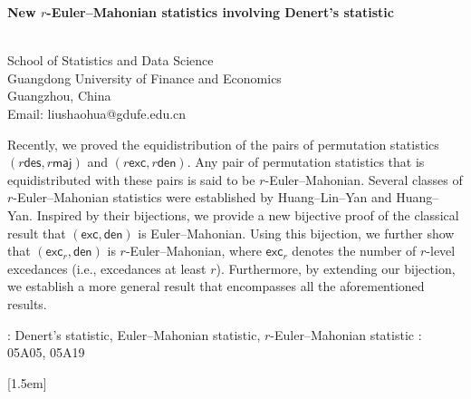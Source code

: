 \documentclass[12pt]{article}
\begin{document}


\begin{center}
{\Large{\bf{New $r$-Euler--Mahonian statistics involving Denert's statistic
			\vskip 1mm}}}
\end{center}
\vspace{0mm}
\begin{center}
	\\
	\vskip 1mm
	{School of Statistics and Data Science\\
		Guangdong University of Finance and Economics\\
		Guangzhou, China\\
		Email: liushaohua@gdufe.edu.cn}
\end{center}
 \title{}


 \vskip 1mm

Recently, we proved the equidistribution of the pairs of permutation statistics $(r\textsf{des},r\textsf{maj})$ and $(r\textsf{exc},r\textsf{den})$.
Any pair of permutation statistics that is equidistributed with these pairs is said to be $r$-Euler--Mahonian.
Several classes of $r$-Euler--Mahonian statistics were established by Huang--Lin--Yan and Huang--Yan.
Inspired by their bijections,
we provide a new bijective proof of the classical result that $(\textsf{exc},\textsf{den})$ is Euler--Mahonian.
Using this bijection, we further show that $(\textsf{exc}_{r},\textsf{den})$ is $r$-Euler--Mahonian,
where $\textsf{exc}_{r}$ denotes the number of $r$-level excedances (i.e., excedances at least $r$).
Furthermore, by extending our bijection, 
we establish a more general result that encompasses all the aforementioned results.



   \vskip 1mm
: Denert's statistic,
Euler--Mahonian statistic, $r$-Euler--Mahonian statistic
   \vskip 1mm
: 05A05, 05A19
   \vskip -2mm

[1.5em]
{\footnotesize \vspace{-10pt}}
{\contentslabel{1.5em}}{\hspace*{-1.6em}}
{~~\contentspage}
\end{document}
